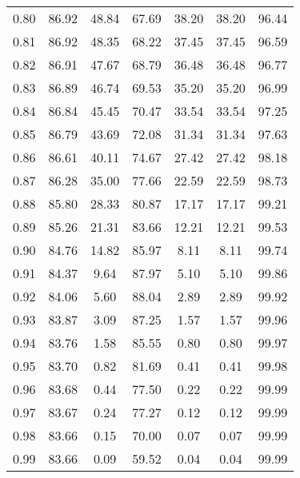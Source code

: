 \begin{tabular}{|c|c|c|c|c|c|c|}
      0.80 &     86.92 &     48.84 &      67.69 &   38.20 &      38.20 &         96.44 \\
      0.81 &     86.92 &     48.35 &      68.22 &   37.45 &      37.45 &         96.59 \\
      0.82 &     86.91 &     47.67 &      68.79 &   36.48 &      36.48 &         96.77 \\
      0.83 &     86.89 &     46.74 &      69.53 &   35.20 &      35.20 &         96.99 \\
      0.84 &     86.84 &     45.45 &      70.47 &   33.54 &      33.54 &         97.25 \\
      0.85 &     86.79 &     43.69 &      72.08 &   31.34 &      31.34 &         97.63 \\
      0.86 &     86.61 &     40.11 &      74.67 &   27.42 &      27.42 &         98.18 \\
      0.87 &     86.28 &     35.00 &      77.66 &   22.59 &      22.59 &         98.73 \\
      0.88 &     85.80 &     28.33 &      80.87 &   17.17 &      17.17 &         99.21 \\
      0.89 &     85.26 &     21.31 &      83.66 &   12.21 &      12.21 &         99.53 \\
      0.90 &     84.76 &     14.82 &      85.97 &    8.11 &       8.11 &         99.74 \\
      0.91 &     84.37 &      9.64 &      87.97 &    5.10 &       5.10 &         99.86 \\
      0.92 &     84.06 &      5.60 &      88.04 &    2.89 &       2.89 &         99.92 \\
      0.93 &     83.87 &      3.09 &      87.25 &    1.57 &       1.57 &         99.96 \\
      0.94 &     83.76 &      1.58 &      85.55 &    0.80 &       0.80 &         99.97 \\
      0.95 &     83.70 &      0.82 &      81.69 &    0.41 &       0.41 &         99.98 \\
      0.96 &     83.68 &      0.44 &      77.50 &    0.22 &       0.22 &         99.99 \\
      0.97 &     83.67 &      0.24 &      77.27 &    0.12 &       0.12 &         99.99 \\
      0.98 &     83.66 &      0.15 &      70.00 &    0.07 &       0.07 &         99.99 \\
      0.99 &     83.66 &      0.09 &      59.52 &    0.04 &       0.04 &         99.99 \\
\bottomrule
\end{tabular}

